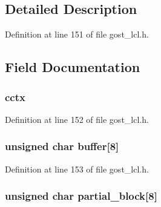 \subsection{Detailed Description}


Definition at line 151 of file gost\+\_\+lcl.\+h.



\subsection{Field Documentation}
\subsubsection[{\texorpdfstring{cctx}{cctx}}]{ cctx}\hypertarget{structossl__gost__imit__ctx_a4536f57bd141b77644121499b784cabf}{}\label{structossl__gost__imit__ctx_a4536f57bd141b77644121499b784cabf}


Definition at line 152 of file gost\+\_\+lcl.\+h.

\subsubsection[{\texorpdfstring{buffer}{buffer}}]{\setlength{\rightskip}{0pt plus 5cm}unsigned char buffer\mbox{[}8\mbox{]}}\hypertarget{structossl__gost__imit__ctx_ad1369d5565262307a4ba9a32a3d94c60}{}\label{structossl__gost__imit__ctx_ad1369d5565262307a4ba9a32a3d94c60}


Definition at line 153 of file gost\+\_\+lcl.\+h.

\subsubsection[{\texorpdfstring{partial\+\_\+block}{partial_block}}]{\setlength{\rightskip}{0pt plus 5cm}unsigned char partial\+\_\+block\mbox{[}8\mbox{]}}\hypertarget{structossl__gost__imit__ctx_a389f595c2c3b632af351f6e25abc4ccd}{}\label{structossl__gost__imit__ctx_a389f595c2c3b632af351f6e25abc4ccd}


